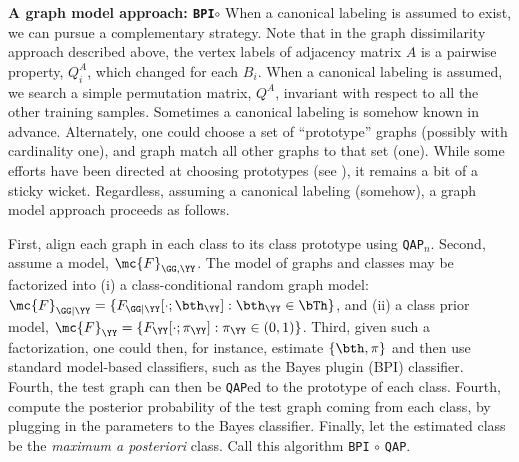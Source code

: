 \documentclass[10pt,journal,cspaper,compsoc]{IEEEtran}
\begin{document}


\textbf{A graph model approach: \texttt{BPI}$\circ$\qap} %
When a canonical labeling is assumed to exist, we can pursue a complementary strategy. Note that in the graph dissimilarity approach described above, the vertex labels of adjacency matrix $A$ is a pairwise property, $Q^A_i$, which changed for each $B_i$.  When a canonical labeling is assumed, we search a simple permutation matrix, $Q^A$, invariant with respect to all the other training samples.  Sometimes a canonical labeling is somehow known in advance. Alternately, one could choose a set of ``prototype'' graphs (possibly with cardinality one), and graph match all other graphs to that set (one).  While some efforts have been directed at choosing prototypes (see  \cite{Bunke2011}), it remains a bit of a sticky wicket.  Regardless, assuming a canonical labeling (somehow), a graph model approach proceeds as follows.   




First, align each graph in each class to its class prototype using \texttt{QAP}$_n$.  Second, assume a  model, $\mc{F}_{\GG,\YY}$.  The model of graphs and classes may be factorized into (i) a class-conditional random graph model: $\mc{F}_{\GG  | \YY} = \{F_{\GG|\YY}[\cdot; \bth_{\YY}] : \bth_{\YY} \in \bTh\}$, and (ii) a class prior model, $\mc{F}_{\YY} = \{F_{\YY}[\cdot; \pi_{\YY}] : \pi_{\YY} \in (0,1)\}$.  Third, given such a factorization, one could then, for instance, estimate $\{\bth,\pi\}$ and then use standard model-based classifiers, such as the Bayes plugin (BPI) classifier.   Fourth, the test graph can then be \texttt{QAP}ed to the prototype of each class.  Fourth, compute the posterior probability of the test graph coming from each class, by plugging in the parameters to the Bayes classifier.  Finally, let the estimated class be the \emph{maximum a posteriori} class.  Call this algorithm \texttt{BPI} $\circ$ \texttt{QAP}.
\end{document}
